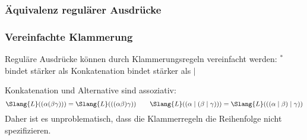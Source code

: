 \documentclass[aspectratio=1610,onlymath]{beamer}
\begin{document}
\begin{frame}\frametitle{Äquivalenz regulärer Ausdrücke}

\medskip


\end{frame}

\begin{frame}\frametitle{Vereinfachte Klammerung}

Reguläre Ausdrücke können durch Klammerungsregeln vereinfacht werden:
\alert{${}^*$ bindet stärker als Konkatenation bindet stärker als $\mid$}
\medskip

\pause

Konkatenation und Alternative sind assoziativ:
\[
\Slang{L}((\alpha(\beta\gamma))) = \Slang{L}(((\alpha\beta)\gamma)) \qquad
\Slang{L}((\alpha\mid(\beta\mid\gamma))) = \Slang{L}(((\alpha\mid\beta)\mid\gamma))
\]
Daher ist es unproblematisch, dass die Klammerregeln die Reihenfolge nicht spezifizieren.\bigskip


\end{frame}
\end{document}
